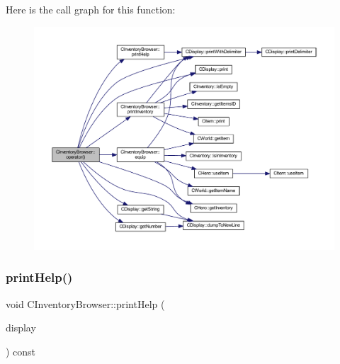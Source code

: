 Here is the call graph for this function\+:\nopagebreak
\begin{figure}[H]
\begin{center}
\leavevmode
\includegraphics[width=350pt]{class_c_inventory_browser_a91c51766048ba5629b125b9a444d31bb_cgraph}
\end{center}
\end{figure}
\mbox{\label{class_c_inventory_browser_a96d9a928a1931b0df289b91baa3ae071}} 
\subsubsection{\texorpdfstring{print\+Help()}{printHelp()}}
{\footnotesize\ttfamily void C\+Inventory\+Browser\+::print\+Help (\begin{DoxyParamCaption}\item[{const \mbox{\hyperlink{class_c_display}{C\+Display}} \&}]{display }\end{DoxyParamCaption}) const\hspace{0.3cm}{\ttfamily [protected]}}

